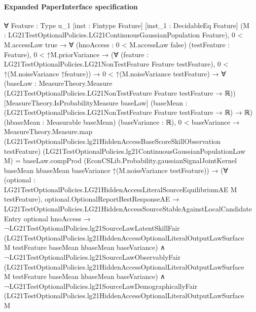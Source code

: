 \documentclass[10pt]{article}
\begin{document}
\paragraph{Expanded PaperInterface specification}
\begin{ReviewVerbatim}
∀ {Feature : Type u_1} [inst : Fintype Feature] [inst_1 : DecidableEq Feature]
  (M : LG21TestOptionalPolicies.LG21ContinuousGaussianPopulation Feature),
  0 < M.accessLaw {true} →
    ∀ (hnoAccess : 0 < M.accessLaw {false}) (testFeature : Feature),
      0 < ↑M.priorVariance →
        (∀ (feature : LG21TestOptionalPolicies.LG21NonTestFeature Feature testFeature),
            0 < ↑(M.noiseVariance ↑feature)) →
          0 < ↑(M.noiseVariance testFeature) →
            ∀ (baseLaw : MeasureTheory.Measure (LG21TestOptionalPolicies.LG21NonTestFeature Feature testFeature → ℝ))
              [MeasureTheory.IsProbabilityMeasure baseLaw]
              (baseMean : (LG21TestOptionalPolicies.LG21NonTestFeature Feature testFeature → ℝ) → ℝ)
              (hbaseMean : Measurable baseMean) (baseVariance : ℝ),
              0 < baseVariance →
                MeasureTheory.Measure.map
                      (LG21TestOptionalPolicies.lg21HiddenAccessBaseScoreSkillObservation testFeature)
                      (LG21TestOptionalPolicies.lg21ContinuousGaussianPopulationLaw M) =
                    baseLaw.compProd
                      (EconCSLib.Probability.gaussianSignalJointKernel baseMean hbaseMean baseVariance
                        ↑(M.noiseVariance testFeature)) →
                  (∀ (optional : LG21TestOptionalPolicies.LG21HiddenAccessLiteralSourceEquilibriumAE M testFeature),
                      optional.OptionalReportBestResponseAE →
                        LG21TestOptionalPolicies.LG21HiddenAccessSourceStableAgainstLocalCandidateEntry optional
                            hnoAccess →
                          ¬LG21TestOptionalPolicies.lg21SourceLawLatentSkillFair
                                (LG21TestOptionalPolicies.lg21HiddenAccessOptionalLiteralOutputLawSurface M testFeature
                                  baseMean hbaseMean baseVariance) ∧
                            ¬LG21TestOptionalPolicies.lg21SourceLawObservablyFair
                                  (LG21TestOptionalPolicies.lg21HiddenAccessOptionalLiteralOutputLawSurface M
                                    testFeature baseMean hbaseMean baseVariance) ∧
                              ¬LG21TestOptionalPolicies.lg21SourceLawDemographicallyFair
                                  (LG21TestOptionalPolicies.lg21HiddenAccessOptionalLiteralOutputLawSurface M

\end{ReviewVerbatim}
\end{document}
